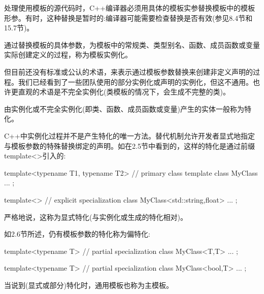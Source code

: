 处理使用模板的源代码时，C++编译器必须用具体的模板实参替换模板中的模板形参。有时，这种替换是暂时的:编译器可能需要检查替换是否有效(参见8.4节和15.7节)。

通过替换模板的具体参数，为模板中的常规类、类型别名、函数、成员函数或变量实际创建定义的过程，称为模板实例化。

但目前还没有标准或公认的术语，来表示通过模板参数替换来创建非定义声明的过程。我们已经看到了一些团队使用的部分实例化或声明的实例化，但这不通用。也许更直观的术语是不完全实例化(类模板的情况下，会生成不完整的类)。

由实例化或不完全实例化(即类、函数、成员函数或变量)产生的实体一般称为特化。

C++中实例化过程并不是产生特化的唯一方法。替代机制允许开发者显式地指定与模板参数的特殊替换绑定的声明。如在2.5节中看到的，这样的特化是通过前缀template<>引入的:

\begin{cpp}
template<typename T1, typename T2> // primary class template
class MyClass {
  ...
};

template<> // explicit specialization
class MyClass<std::string,float> {
  ...
};
\end{cpp}

严格地说，这称为显式特化(与实例化或生成的特化相对)。

如2.6节所述，仍有模板参数的特化称为偏特化:

\begin{cpp}
template<typename T> // partial specialization
class MyClass<T,T> {
  ...
};

template<typename T> // partial specialization
class MyClass<bool,T> {
  ...
};
\end{cpp}

当说到(显式或部分)特化时，通用模板也称为主模板。
